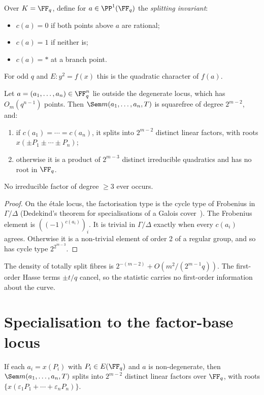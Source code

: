 Over $K=\FF_q$, define for $a\in\PP^1(\FF_q)$ the \emph{splitting
invariant}:
\begin{itemize}
\item $c(a)=0$ if both points above $a$ are rational;
\item $c(a)=1$ if neither is;
\item $c(a)=\ast$ at a branch point.
\end{itemize}
For odd $q$ and $E:y^2=f(x)$ this is the quadratic character of $f(a)$.

\begin{theorem}\label{thm:factor}
Let $a=(a_1,\ldots,a_n)\in\FF_q^n$ lie outside the degenerate locus, which
has $O_m(q^{n-1})$ points. Then $\Sem m(a_1,\ldots,a_n,T)$ is squarefree of
degree $2^{m-2}$, and:
\begin{enumerate}
\item if $c(a_1)=\cdots=c(a_n)$, it splits into $2^{m-2}$ distinct
  linear factors, with roots $x(\pm P_1\pm\cdots\pm P_n)$;
\item otherwise it is a product of $2^{m-3}$ distinct irreducible
  quadratics and has no root in $\FF_q$.
\end{enumerate}
No irreducible factor of degree $\ge3$ ever occurs.
\end{theorem}

\begin{proof}
On the étale locus, the factorisation type is the cycle type of
Frobenius in $\Gamma/\Delta$ (Dedekind's theorem for specialisations of a
Galois cover~\cite{friedjarden2008}). The Frobenius element is
$((-1)^{c(a_i)})_i$. It is trivial in $\Gamma/\Delta$ exactly when every
$c(a_i)$ agrees. Otherwise it is a non-trivial element of order 2 of a
regular group, and so has cycle type $2^{2^{m-3}}$.
\end{proof}

The density of totally split fibres is $2^{-(m-2)}+O(m^2/(2^{m-1}q))$. The
first-order Hasse terms $\pm t/q$ cancel, so the statistic carries no
first-order information about the curve.

\section{Specialisation to the factor-base locus}

\begin{theorem}\label{thm:fbsplit}
If each $a_i=x(P_i)$ with $P_i\in E(\FF_q)$ and $a$ is non-degenerate, then
$\Sem m(a_1,\ldots,a_n,T)$ splits into $2^{m-2}$ distinct linear factors
over $\FF_q$, with roots $\{x(\varepsilon_1P_1+\cdots+\varepsilon_nP_n)\}$.
\end{theorem}

